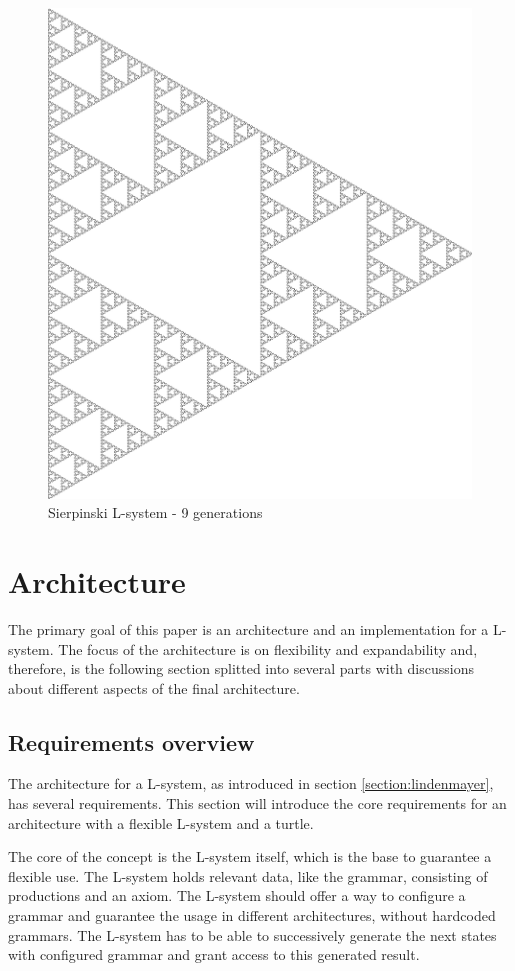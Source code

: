 \documentclass[english]{cpp-hmwk}
\begin{document}
\begin{figure}[h!]
	\centering
	\includegraphics[width=0.6\columnwidth]{../graphs/sierpinski.png}
	\caption{Sierpinski L-system - 9 generations}
	\label{figure:Sierpinski}
\end{figure}
 
\clearpage
\section{Architecture}
The primary goal of this paper is an architecture and an implementation for a L-system. The focus of the architecture is on flexibility and expandability and, therefore, is the following section splitted into several parts with discussions about different aspects of the final architecture.

\subsection{Requirements overview}
The architecture for a L-system, as introduced in section \ref{section:lindenmayer}, has several requirements. This section will introduce the core requirements for an architecture with a flexible L-system and a turtle.

\medskip
\noindent The core of the concept is the L-system itself, which is the base to guarantee a flexible use. The L-system holds relevant data, like the grammar, consisting of productions and an axiom. The L-system should offer a way to configure a grammar and guarantee the usage in different architectures, without hardcoded grammars. The L-system has to be able to successively generate the next states with configured grammar and grant access to this generated result.
\end{document}
